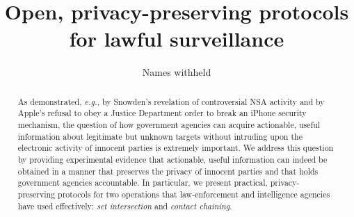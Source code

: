 \documentclass[USenglish,oneside,twocolumn]{article}
\begin{document}
 

  \author[1]{Names withheld}






  \title{\huge Open, privacy-preserving protocols for lawful surveillance}



  \begin{abstract}
{As demonstrated, {\it e.g.}, by Snowden's revelation of controversial NSA 
activity and by Apple's refusal to obey a Justice Department order to break 
an iPhone security mechanism, the question of how government agencies can
acquire actionable, useful information about legitimate but unknown targets 
without intruding upon the electronic activity of innocent parties is 
extremely important.  We address this question by providing experimental
evidence that actionable, useful information can indeed be obtained in a manner
that preserves the privacy of innocent parties and that holds government
agencies accountable.  In particular, we present practical, privacy-preserving
protocols for two operations that law-enforcement and intelligence agencies
have used effectively: {\it set intersection} and {\it contact chaining}.}
  \end{abstract}



\maketitle







%
\end{document}
